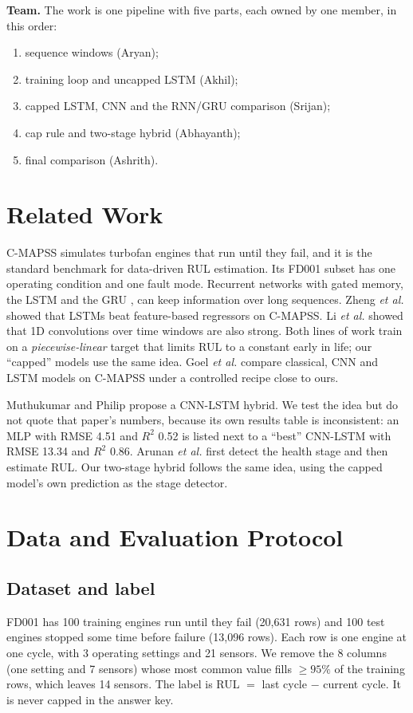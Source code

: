 \documentclass[conference]{IEEEtran}
\begin{document}
\textbf{Team.} The work is one pipeline with five parts, each owned by one member, in this order:
\begin{enumerate}
  \item sequence windows (Aryan);
  \item training loop and uncapped LSTM (Akhil);
  \item capped LSTM, CNN and the RNN/GRU comparison (Srijan);
  \item cap rule and two-stage hybrid (Abhayanth);
  \item final comparison (Ashrith).
\end{enumerate}

\section{Related Work}
C-MAPSS \cite{saxena2008damage} simulates turbofan engines that run until they fail, and it is the standard benchmark for data-driven RUL estimation. Its FD001 subset has one operating condition and one fault mode. Recurrent networks with gated memory, the LSTM \cite{hochreiter1997lstm} and the GRU \cite{cho2014gru}, can keep information over long sequences. Zheng \emph{et al.} \cite{zheng2017lstm} showed that LSTMs beat feature-based regressors on C-MAPSS. Li \emph{et al.} \cite{li2018cnn} showed that 1D convolutions over time windows are also strong. Both lines of work train on a \emph{piecewise-linear} target that limits RUL to a constant early in life; our ``capped'' models use the same idea. Goel \emph{et al.} \cite{goel2026comparative} compare classical, CNN and LSTM models on C-MAPSS under a controlled recipe close to ours.

Muthukumar and Philip \cite{muthukumar2024cnnlstm} propose a CNN-LSTM hybrid. We test the idea but do not quote that paper's numbers, because its own results table is inconsistent: an MLP with RMSE 4.51 and $R^2$ 0.52 is listed next to a ``best'' CNN-LSTM with RMSE 13.34 and $R^2$ 0.86. Arunan \emph{et al.} \cite{arunan2024changepoint} first detect the health stage and then estimate RUL. Our two-stage hybrid follows the same idea, using the capped model's own prediction as the stage detector.

\section{Data and Evaluation Protocol}
\label{sec:data}

\subsection{Dataset and label}
FD001 has 100 training engines run until they fail (20{,}631 rows) and 100 test engines stopped some time before failure (13{,}096 rows). Each row is one engine at one cycle, with 3 operating settings and 21 sensors. We remove the 8 columns (one setting and 7 sensors) whose most common value fills $\ge 95\%$ of the training rows, which leaves 14 sensors. The label is RUL $=$ last cycle $-$ current cycle. It is never capped in the answer key.
\end{document}
